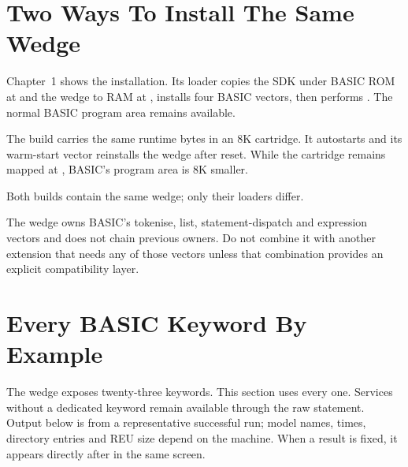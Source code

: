 

\section{Two Ways To Install The Same Wedge}

Chapter~1 shows the  installation. Its loader copies the SDK under
BASIC ROM at  and the wedge to RAM at , installs four
BASIC vectors, then performs . The normal BASIC program area remains
available.

The  build carries the same runtime bytes in an 8K cartridge. It
autostarts and its warm-start vector reinstalls the wedge after reset. While the
cartridge remains mapped at , BASIC's program area is 8K
smaller.

Both builds contain the same wedge; only their loaders differ.


\begin{warning}
The wedge owns BASIC's tokenise, list, statement-dispatch and expression
vectors and does not chain previous owners. Do not combine it with another
extension that needs any of those vectors unless that combination provides an
explicit compatibility layer.
\end{warning}

\section{Every BASIC Keyword By Example}

The wedge exposes twenty-three keywords. This section uses every one. Services
without a dedicated keyword remain available through the raw 
statement. Output below is from a representative successful run; model names,
times, directory entries and REU size depend on the machine. When a result is
fixed, it appears directly after  in the same screen.


